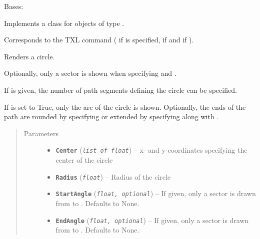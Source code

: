 \documentclass[letterpaper,10pt,english]{sphinxmanual}
\begin{document}
\begin{fulllineitems}
\label{Chapters/PythonModuleReference/Patterns/TXLWizard.Patterns.Circle:TXLWizard.Patterns.Circle.Circle}
Bases: {\hyperref[Chapters/PythonModuleReference/Patterns/TXLWizard.Patterns.AbstractPattern:TXLWizard.Patterns.AbstractPattern.AbstractPattern]{}}

Implements a class for  objects of type .

Corresponds to the TXL command  ( if  is specified,  if  and  if ).

Renders a circle.

Optionally, only a sector is shown when specifying  and .

If  is given, the number of path segments defining the circle can be specified.

If  is set to True, only the arc of the circle is shown. Optionally, the ends of the path are rounded by
specifying  or extended by specifying  along with .
\begin{quote}\begin{description}
\item[{Parameters}] \leavevmode\begin{itemize}
\item {} 
\textbf{\texttt{Center}} (\emph{\texttt{list of float}}) -- x- and y-coordinates specifying the center of the circle

\item {} 
\textbf{\texttt{Radius}} (\emph{\texttt{float}}) -- Radius of the circle

\item {} 
\textbf{\texttt{StartAngle}} (\emph{\texttt{float, optional}}) -- If given, only a sector is drawn from  to .
Defaults to None.

\item {} 
\textbf{\texttt{EndAngle}} (\emph{\texttt{float, optional}}) -- If given, only a sector is drawn from  to .
Defaults to None.


\end{itemize}
\end{description}
\end{quote}
\end{fulllineitems}
\end{document}

